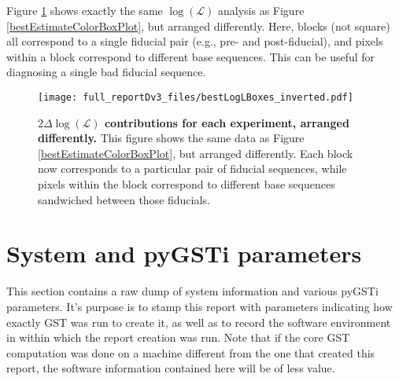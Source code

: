 \documentclass{article}[11pt]
\begin{document}
{Figure \ref{invertedBestEstimateColorBoxPlot} shows exactly the same $\log(\mathcal{L})$ analysis as Figure \ref{bestEstimateColorBoxPlot}, but arranged differently.  Here, blocks (not square) all correspond to a single fiducial pair (e.g., pre- and post-fiducial), and pixels within a block correspond to different base sequences.  This can be useful for diagnosing a single bad fiducial sequence.

\begin{figure}
\begin{center}
\texttt{[image: full\_reportDv3\_files/bestLogLBoxes\_inverted.pdf]}
\caption{\textbf{$2\Delta\log(\mathcal{L})$ contributions for each experiment, arranged differently.}  This figure shows the same data as Figure \ref{bestEstimateColorBoxPlot}, but arranged differently.  Each block now corresponds to a particular pair of fiducial sequences, while pixels within the block correspond to different base sequences sandwiched between those fiducials.\label{invertedBestEstimateColorBoxPlot}}
\end{center}
\end{figure}

}{}

\section{System and pyGSTi parameters\label{metadata}}
This section contains a raw dump of system information and various pyGSTi parameters.  It's purpose is to stamp this report with parameters indicating how exactly GST was run to create it, as well as to record the software environment in within which the report creation was run.  Note that if the core GST computation was done on a machine different from the one that created this report, the software information contained here will be of less value.
\end{document}
